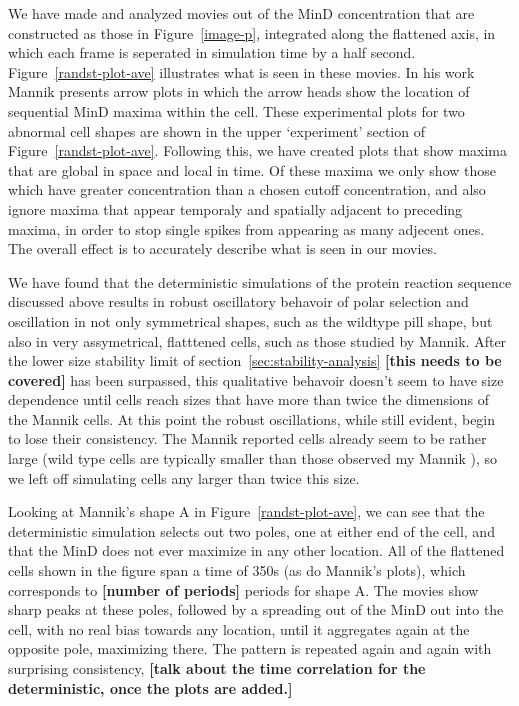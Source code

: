 \documentclass[letterpaper,twocolumn,amsmath,amssymb,pre]{revtex4-1}
\newcommand{\red}[1]{{\bf \color{red} #1}}
\newcommand{\fixme}[1]{\red{[#1]}}
\begin{document}
We have made and analyzed movies out of the MinD
concentration that are constructed as those in Figure~\ref{image-p},
integrated along the flattened axis, in which each frame is seperated
in simulation time by a half second. Figure~\ref{randst-plot-ave}
illustrates what is seen in these movies. In his work Mannik presents
arrow plots in which the arrow heads show the location of sequential
MinD maxima within the cell.  These experimental plots for two abnormal cell
shapes are shown in the upper `experiment' section of
Figure~\ref{randst-plot-ave}.  Following this, we have created plots
that show maxima that are global in space and local in time.  Of these
maxima we only show those which have greater concentration than a
chosen cutoff concentration, and also ignore maxima that appear
temporaly and spatially adjacent to preceding maxima, in order to
stop single spikes from appearing as many adjecent ones.  The overall
effect is to accurately describe what is seen in our movies.

We have found that the deterministic simulations of the protein
reaction sequence discussed above results in robust oscillatory
behavoir of polar selection and oscillation in not only symmetrical
shapes, such as the wildtype pill shape, but also in very
assymetrical, flatttened cells, such as those studied by Mannik.
After the lower size stability limit of
section~\ref{sec:stability-analysis} \fixme{this needs to be covered}
has been surpassed, this qualitative behavoir doesn't seem to have
size dependence until cells reach sizes that have more than twice the
dimensions of the Mannik cells.  At this point the robust
oscillations, while still evident, begin to lose their consistency.
The Mannik reported cells already seem to be rather large (wild type
cells are typically smaller than those observed my Mannik
\cite{kubitschek1990cell,kubitschek1968linear,mannik2012robustness}),
so we left off simulating cells any larger than twice this size.

Looking at Mannik's shape A in Figure~\ref{randst-plot-ave}, we can
see that the deterministic simulation selects out two poles, one at
either end of the cell, and that the MinD does not ever maximize in
any other location.  All of the flattened cells shown in the figure
span a time of 350s (as do Mannik's plots), which corresponds to
\fixme{number of periods} periods for shape A.  The movies show sharp
peaks at these poles, followed by a spreading out of the MinD out into
the cell, with no real bias towards any location, until it aggregates
again at the opposite pole, maximizing there.  The pattern is repeated
again and again with surprising consistency, \fixme{talk about the
  time correlation for the deterministic, once the plots are added.}
\end{document}
